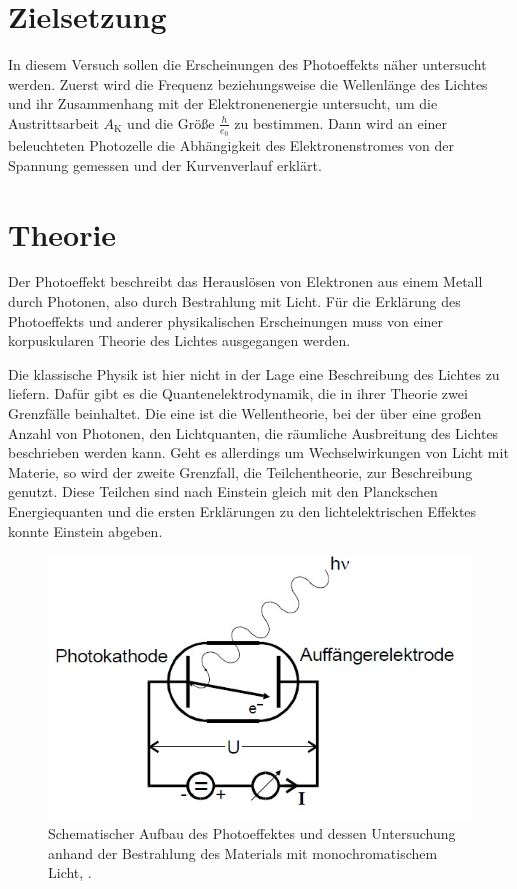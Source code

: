 \section{Zielsetzung}
\label{sec:Zielsetzung}
In diesem Versuch sollen die Erscheinungen des Photoeffekts näher untersucht werden. Zuerst wird die Frequenz beziehungsweise die Wellenlänge des Lichtes und ihr Zusammenhang mit der Elektronenenergie untersucht, um die Austrittsarbeit $A_\text{K}$ und die Größe $\frac{h}{e_0}$ zu bestimmen.
Dann wird an einer beleuchteten Photozelle die Abhängigkeit des Elektronenstromes von der Spannung gemessen und der Kurvenverlauf erklärt.

\section{Theorie}
\label{sec:Theorie}
Der Photoeffekt beschreibt das Herauslösen von Elektronen aus einem Metall durch Photonen, also durch Bestrahlung mit Licht. Für die Erklärung des Photoeffekts und anderer physikalischen Erscheinungen muss von einer korpuskularen Theorie des Lichtes ausgegangen werden. 

Die klassische Physik ist hier nicht in der Lage eine Beschreibung des Lichtes zu liefern. Dafür gibt es die Quantenelektrodynamik, die in ihrer Theorie zwei Grenzfälle beinhaltet. Die eine ist die Wellentheorie, bei der über eine großen Anzahl von Photonen, den Lichtquanten, die räumliche Ausbreitung des Lichtes beschrieben werden kann. 
Geht es allerdings um Wechselwirkungen von Licht mit Materie, so wird der zweite Grenzfall, die Teilchentheorie, zur Beschreibung genutzt. Diese Teilchen sind nach Einstein gleich mit den Planckschen Energiequanten und die ersten Erklärungen zu den lichtelektrischen Effektes konnte Einstein abgeben.

\begin{figure}[h!]
	\centering
	\includegraphics[width=0.6\linewidth]{AufbauPhotoeffekt.jpg}
	\caption{Schematischer Aufbau des Photoeffektes und dessen Untersuchung anhand der Bestrahlung des Materials mit monochromatischem Licht, \cite[2]{anleitung500}.}
	\label{fig:aufbauphotoeffekt}
\end{figure}

